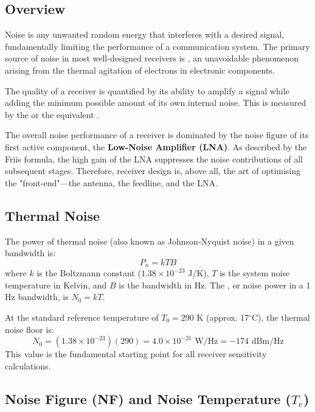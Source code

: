 \subsection{Overview}

Noise is any unwanted random energy that interferes with a desired signal, fundamentally limiting the performance of a communication system. The primary source of noise in most well-designed receivers is , an unavoidable phenomenon arising from the thermal agitation of electrons in electronic components.

The quality of a receiver is quantified by its ability to amplify a signal while adding the minimum possible amount of its own internal noise. This is measured by the  or the equivalent .

\begin{keyconcept}
    The overall noise performance of a receiver is dominated by the noise figure of its first active component, the \textbf{Low-Noise Amplifier (LNA)}. As described by the Friis formula, the high gain of the LNA suppresses the noise contributions of all subsequent stages. Therefore, receiver design is, above all, the art of optimising the "front-end"---the antenna, the feedline, and the LNA.
\end{keyconcept}


\subsection{Thermal Noise}

The power of thermal noise (also known as Johnson-Nyquist noise) in a given bandwidth is:
\begin{equation}
    P_n = kTB
\end{equation}
where $k$ is the Boltzmann constant ($1.38 \times 10^{-23}$ J/K), $T$ is the system noise temperature in Kelvin, and $B$ is the bandwidth in Hz. The , or noise power in a 1 Hz bandwidth, is $N_0 = kT$.

At the standard reference temperature of $T_0 = 290$ K (approx. 17$^\circ$C), the thermal noise floor is:
\[ N_0 = (1.38 \times 10^{-23})(290) = 4.0 \times 10^{-21} \text{ W/Hz} = -174 \text{ dBm/Hz} \]
This value is the fundamental starting point for all receiver sensitivity calculations.


\subsection{Noise Figure (NF) and Noise Temperature ($T_e$)}

